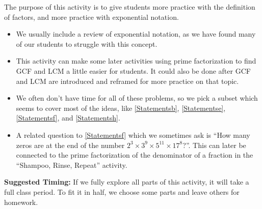 \documentclass[nooutcomes]{ximera}
\begin{document}
\newpage
\begin{instructorNotes}
The purpose of this activity is to give students more practice with the definition of factors, and more practice with exponential notation.

\begin{itemize}
    \item  We usually include a review of exponential notation, as we have found many of our students to struggle with this concept.
    \item This activity can make some later activities using prime factorization to find GCF and LCM a little easier for students.  It could also be done after GCF and LCM are introduced and reframed for more practice on that topic.
    \item We often don't have time for all of these problems, so we pick a subset which seems to cover most of the ideas, like \ref{Statementsb}, \ref{Statementse}, \ref{Statementsf}, and \ref{Statementsh}.
    \item A related question to \ref{Statementsf} which we sometimes ask is ``How many zeros are at the end of the number $2^3\times 3^9\times 5^{11} \times 17^8$?''.  This can later be connected to the prime factorization of the denominator of a fraction in  the ``Shampoo, Rinse, Repeat'' activity.
\end{itemize}







{\bf Suggested Timing:} If we fully explore all parts of this activity, it will take a full class period.  To fit it in half, we choose some parts and leave others for homework.
\end{instructorNotes}
\end{document}

